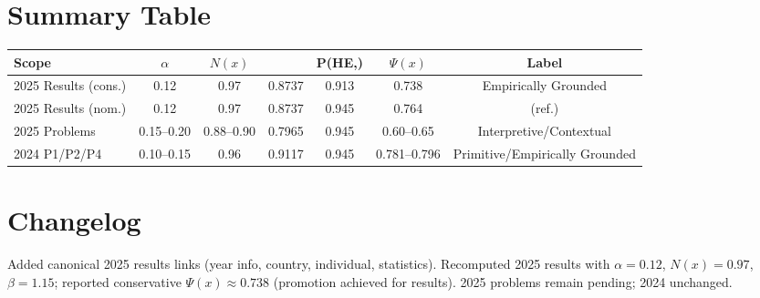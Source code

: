 \documentclass[11pt]{article}
\newcommand{\Nx}{N(x)}
\newcommand{\Px}{\Psi(x)}
\newcommand{\post}{P(H\mid E,\beta)}
\newcommand{\pen}{\mathrm{Penalty}}
\begin{document}
\section{Summary Table}
\begin{center}
\renewcommand{\arraystretch}{1.12}
\begin{tabular}{@{}lcccccc@{}}
\toprule
Scope & $\alpha$ & $\Nx$ & \pen & \post & $\Px$ & Label\\
\midrule
2025 Results (cons.) & 0.12 & 0.97 & 0.8737 & 0.913 & 0.738 & Empirically Grounded\\
2025 Results (nom.) & 0.12 & 0.97 & 0.8737 & 0.945 & 0.764 & (ref.)\\
2025 Problems & 0.15--0.20 & 0.88--0.90 & 0.7965 & 0.945 & 0.60--0.65 & Interpretive/Contextual\\
2024 P1/P2/P4 & 0.10--0.15 & 0.96 & 0.9117 & 0.945 & 0.781--0.796 & Primitive/Empirically Grounded\\
\bottomrule
\end{tabular}
\end{center}

\section*{Changelog}
Added canonical 2025 results links (year info, country, individual, statistics). Recomputed 2025 results with $\alpha=0.12$, $\Nx=0.97$, $\beta=1.15$; reported conservative $\Px\approx 0.738$ (promotion achieved for results). 2025 problems remain pending; 2024 unchanged.
\end{document}
